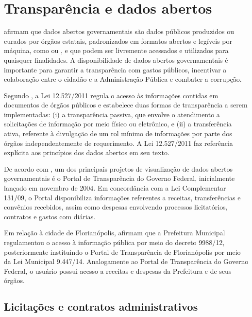 \documentclass[
	12pt,				%
	oneside,			%
	a4paper,			%
	chapter=TITLE,		%
	section=TITLE,		%
	english,			%
	brazil				%
	]{abntex2}
\begin{document}
\section{Transparência e dados abertos}\label{sec:transparencia}

\cite{possamai2020transparencia} afirmam que dados abertos governamentais são dados públicos produzidos ou curados por órgãos estatais, padronizados em formatos abertos e legíveis por máquina, como  ou , e que podem ser livremente acessados e utilizados para quaisquer finalidades. A disponibilidade de dados abertos governamentais é importante para garantir a transparência com gastos públicos, incentivar a colaboração entre o cidadão e a Administração Pública e combater a corrupção.

Segundo \cite{possamai2020transparencia}, a Lei 12.527/2011 regula o acesso às informações contidas em documentos de órgãos públicos e estabelece duas formas de transparência a serem implementadas: (i) a transparência passiva, que envolve o atendimento a solicitações de informação por meio físico ou eletrônico, e (ii) a transferência ativa, referente à divulgação de um rol mínimo de informações por parte dos órgãos independentemente de requerimento. A Lei 12.527/2011 faz referência explícita aos princípios dos dados abertos em seu texto.

De acordo com \cite{nazario2012avaliaccao}, um dos principais projetos de visualização de dados abertos governamentais é o Portal de Transparência do Governo Federal, inicialmente lançado em novembro de 2004. Em concordância com a Lei Complementar 131/09, o Portal disponibiliza informações referentes a receitas, transferências e convênios recebidos, assim como despesas envolvendo processos licitatórios, contratos e gastos com diárias.

Em relação à cidade de Florianópolis, \cite{santos2021ferramenta} afirmam que a Prefeitura Municipal regulamentou o acesso à informação pública por meio do decreto 9988/12, posteriormente instituindo o Portal de Transparência de Florianópolis por meio da Lei Municipal 9.447/14. Analogamente ao Portal de Transparência do Governo Federal, o usuário possui acesso a receitas e despesas da Prefeitura e de seus órgãos.

\subsection{Licitações e contratos administrativos}\label{ssec:licitacoes_contratos}
\end{document}
